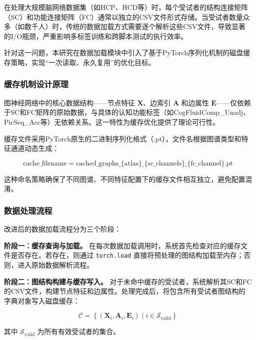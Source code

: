 \documentclass[UTF8, a4paper, 12pt]{article}
\begin{document}
在处理大规模脑网络数据集（如HCP、HCD等）时，每个受试者的结构连接矩阵（SC）和功能连接矩阵（FC）通常以独立的CSV文件形式存储。当受试者数量众多（如数千人）时，传统的数据加载方式需要逐个解析这些CSV文件，导致显著的I/O瓶颈，严重影响多标签训练和跨脚本测试的执行效率。

针对这一问题，本研究在数据加载模块中引入了基于PyTorch序列化机制的磁盘缓存策略，实现``一次读取、永久复用''的优化目标。

\subsubsection{缓存机制设计原理}

图神经网络中的核心数据结构——节点特征 $\mathbf{X}$、边索引 $\mathbf{A}$ 和边属性 $\mathbf{E}$——仅依赖于SC和FC矩阵的原始数据，与具体的认知功能标签（如CogFluidComp\_Unadj、PicSeq\_Acc等）无依赖关系。这一特性为缓存优化提供了理论可行性。

缓存文件采用PyTorch原生的二进制序列化格式（.pt），文件名根据图谱类型和特征通道动态生成：

\begin{equation}
\text{cache\_filename} = \text{cached\_graphs\_}\{\text{atlas}\}\_\{\text{sc\_channels}\}\_\{\text{fc\_channel}\}.\text{pt}
\end{equation}

这种命名策略确保了不同图谱、不同特征配置下的缓存文件相互独立，避免配置混淆。

\subsubsection{数据处理流程}

改进后的数据加载流程分为三个阶段：

\textbf{阶段一：缓存查询与加载。} 在每次数据加载调用时，系统首先检查对应的缓存文件是否存在。若存在，则通过 \texttt{torch.load} 直接将预处理的图结构加载至内存；否则，进入原始数据解析流程。

\textbf{阶段二：图结构构建与缓存写入。} 对于未命中缓存的受试者，系统解析其SC和FC的CSV文件，构建节点特征和边属性。处理完成后，将包含所有受试者图结构的字典对象写入磁盘缓存：

\begin{equation}
\mathcal{C} = \left\{ (\mathbf{X}_i, \mathbf{A}_i, \mathbf{E}_i) \mid i \in \mathcal{S}_{\text{valid}} \right\}
\end{equation}

其中 $\mathcal{S}_{\text{valid}}$ 为所有有效受试者的集合。
\end{document}

